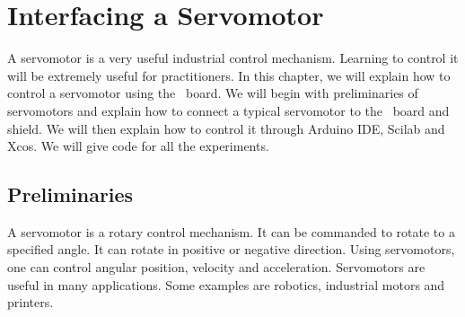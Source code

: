 \chapter {Interfacing a Servomotor}
\thispagestyle{empty}
\label{sec:servo}
\newcommand{\LocSERfig}{\Origin/user-code/servo/figures}
\newcommand{\LocSERscicode}{\Origin/user-code/servo/scilab}
\newcommand{\LocSERscibrief}[1]{{\tt \seqsplit{%
    Origin/user-code/servo/scilab/#1}},
see \fnrefp{fn:file-loc}}

\newcommand{\LocSERardcode}{\Origin/user-code/servo/arduino}
\newcommand{\LocSERardbrief}[1]{{\tt \seqsplit{%
    Origin/user-code/servo/arduino/#1}}, 
see \fnrefp{fn:file-loc}}

\newcommand{\LocSERpycode}{\Origin/user-code/servo/python}
\newcommand{\LocSERpybrief}[1]{{\tt \seqsplit{%
    Origin/user-code/servo/python/#1}}, 
see \fnrefp{fn:file-loc}}

\newcommand{\LocSERjuliacode}{\Origin/user-code/servo/julia}
\newcommand{\LocSERjuliabrief}[1]{{\tt \seqsplit{%
    Origin/user-code/servo/julia/#1}}, 
see \fnrefp{fn:file-loc}}

\newcommand{\LocSEROpenModelicacode}{\Origin/user-code/servo/OpenModelica}
\newcommand{\LocSEROpenModelicabrief}[1]{{\tt \seqsplit{%
    Origin/user-code/servo/OpenModelica/#1}}, 
see \fnrefp{fn:file-loc}}

A servomotor is a very useful industrial control mechanism.  Learning
to control it will be extremely useful for practitioners.  In this
chapter, we will explain how to control a servomotor using the
\arduino\ board.  We will begin with preliminaries of servomotors and
explain how to connect a typical servomotor to the \arduino\ board and
shield.  We will then explain how to control it through Arduino IDE,
Scilab and Xcos.  We will give code for all the experiments.

\section{Preliminaries}
A servomotor is a rotary control mechanism.  It can be commanded to
rotate to a specified angle.  It can rotate in positive or negative
direction.  Using servomotors, one can control
angular position, velocity and acceleration.  Servomotors are useful
in many applications.  Some examples are robotics, industrial motors
and printers.

